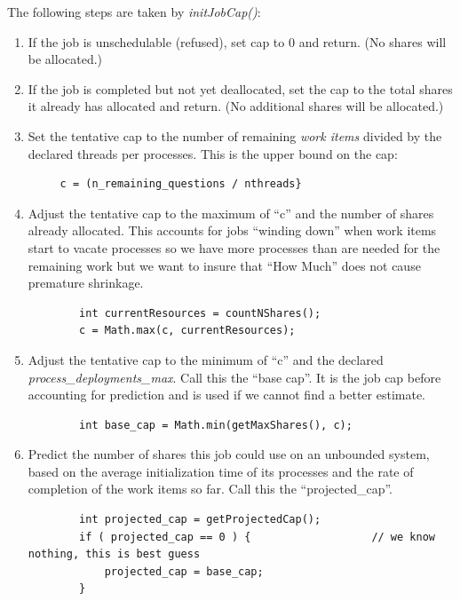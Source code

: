     The following steps are taken by {\em initJobCap()}:
    \begin{enumerate}
      \item If the job is unschedulable (refused), set cap to 0 and return. (No shares will be allocated.)
      \item If the job is completed but not yet deallocated, set the cap to the total shares
        it already has allocated and return. (No additional shares will be allocated.)
        \item Set the tentative cap to the number of remaining {\em work items}  divided by the declared
          threads per processes.  This is the upper bound on the cap:
\begin{verbatim}
     c = (n_remaining_questions / nthreads}
\end{verbatim}

        \item Adjust the tentative cap to the maximum of ``c'' and the number of shares already
          allocated.  This accounts for jobs ``winding down'' when work items start to vacate
          processes so we have more processes than are needed for the remaining work but we 
          want to insure that ``How Much'' does not cause premature shrinkage.
\begin{verbatim}
        int currentResources = countNShares();
        c = Math.max(c, currentResources); 
\end{verbatim}

        \item Adjust the tentative cap to the minimum of ``c'' and the declared {\em process\_deployments\_max}.
          Call this the ``base cap''.  It is the job cap before accounting for prediction and is
          used if we cannot find a better estimate.
\begin{verbatim}
        int base_cap = Math.min(getMaxShares(), c);
\end{verbatim}
          
        \item Predict the number of shares this job could use on an unbounded system,
          based on the average initialization time of its processes and the rate of completion
          of the work items so far.  Call this the ``projected\_cap''.
\begin{verbatim}
        int projected_cap = getProjectedCap();      
        if ( projected_cap == 0 ) {                   // we know nothing, this is best guess
        	projected_cap = base_cap;
        }
\end{verbatim}


\end{enumerate}
